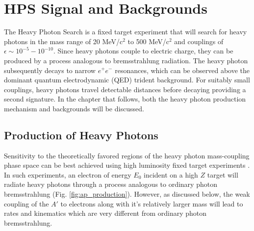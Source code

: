 
\chapter{HPS Signal and Backgrounds}

The Heavy Photon Search is a fixed target experiment that will search for heavy
photons in the mass range of 20 MeV/c$^{2}$ to 500 MeV/c$^{2}$ and couplings
of $\epsilon \sim 10^{-5} - 10^{-10}$.  Since heavy photons couple to electric
charge, they can be produced by a process analogous to bremsstrahlung 
radiation.  The heavy photon subsequently decays to narrow $e^+e^-$ resonances, 
which can be observed above the dominant quantum electrodynamic (QED) trident
background.  For suitably small couplings, heavy photons travel detectable 
distances before decaying providing a second signature.  In the chapter that
follows, both the heavy photon production mechanism and backgrounds will be 
discussed.

\section{Production of Heavy Photons}

Sensitivity to the theoretically favored regions of the heavy photon 
mass-coupling phase space can be best achieved using high luminosity fixed
target experiments \cite{PhysRevD.80.075018}.  In such experiments, an electron
of energy $E_{0}$ incident on a high $Z$ target will radiate heavy photons 
through a process analogous to ordinary photon bremsstrahlung 
%
%
(Fig. \ref{fig:ap_production}).  However, as discussed below, the weak coupling
of the $A'$ to electrons along with it's relatively larger mass will lead to 
rates and kinematics which are very different from ordinary photon 
bremsstrahlung.

